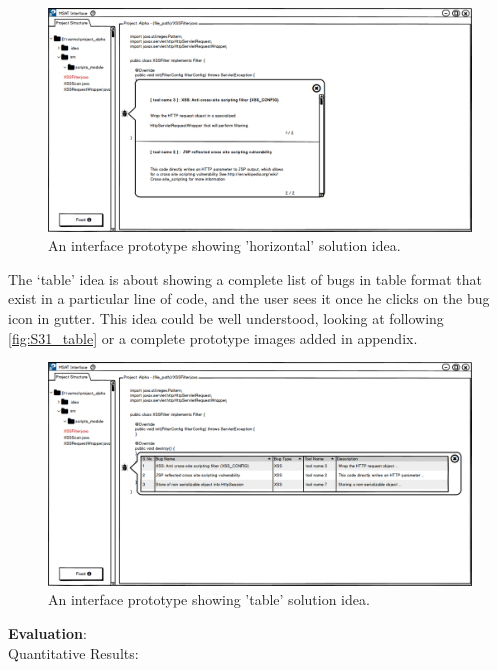 \begin{figure}[hbt!]
	\centering
	\includegraphics[width=\linewidth]{figures/solution_ideas_snaps/S31_horizontal}
	\caption{An interface prototype showing 'horizontal' solution idea.}
	\label{fig:S31_horizontal}
\end{figure} 

The ‘table’ idea is about showing a complete list of bugs in table format that exist in a particular line of code, and the user sees it once he clicks on the bug icon in gutter. This idea could be well understood, looking at following \autoref{fig:S31_table} or a complete prototype images added in appendix. \\

\begin{figure}[hbt!]
	\centering
	\includegraphics[width=\linewidth]{figures/solution_ideas_snaps/S31_table}
	\caption{An interface prototype showing 'table' solution idea.}
	\label{fig:S31_table}
\end{figure} 


\textbf{Evaluation}: \\

Quantitative Results: \\

